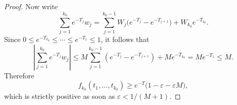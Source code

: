 \documentclass[10pt,a4paper]{amsart}
\begin{document}
\begin{proof}
Now write
\[
\sum_{j=1}^{k_0} e^{-T_j}w_j
=
\sum_{j=1}^{{k_0}-1}W_j\bigl(e^{-T_j}-e^{-T_{j+1}}\bigr)+W_{k_0}e^{-T_{k_0}}.
\]
Since \(0\le e^{-T_{k_0}}\le\cdots\le e^{-T_1}\le1\), it follows that
\[
\left|\sum_{j=1}^{k_0} e^{-T_j}w_j\right|
\le
M\sum_{j=1}^{{k_0}-1}(e^{-T_j}-e^{-T_{j+1}})+Me^{-T_{k_0}}
=
Me^{-T_1}
\le M.
\]
Therefore
\[
f_{k_0}(t_1,\dots,t_{k_0})\ge e^{-T}\bigl(1-\varepsilon-\varepsilon M\bigr),
\]
which is strictly positive as soon as \(\varepsilon<1/(M+1)\).
\end{proof}
\end{document}
